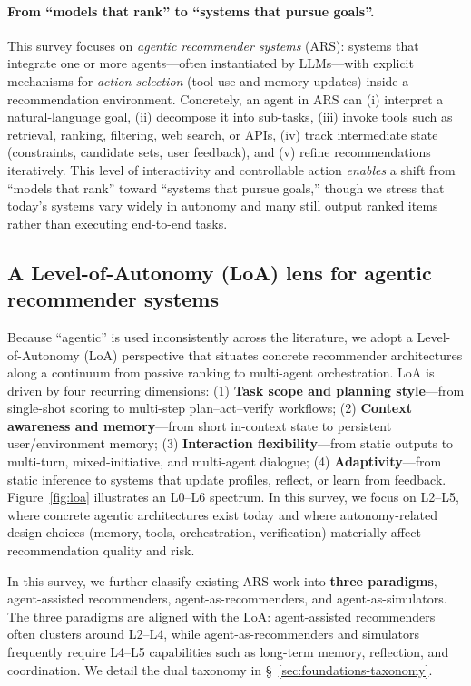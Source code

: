 \paragraph{From ``models that rank'' to ``systems that pursue goals''.}
This survey focuses on \emph{agentic recommender systems} (ARS): systems that integrate one or more agents---often instantiated by LLMs---with explicit mechanisms for \emph{action selection} (\eg tool use and memory updates) inside a recommendation environment.
Concretely, an agent in ARS can (i) interpret a natural-language goal, (ii) decompose it into sub-tasks, (iii) invoke tools such as retrieval, ranking, filtering, web search, or APIs, (iv) track intermediate state (\eg constraints, candidate sets, user feedback), and (v) refine recommendations iteratively.
This level of interactivity and controllable action \emph{enables} a shift from ``models that rank'' toward ``systems that pursue goals,'' though we stress that today’s systems vary widely in autonomy and many still output ranked items rather than executing end-to-end tasks. 


\subsection{A Level-of-Autonomy (LoA) lens for agentic recommender systems}
\label{subsec:loa}

Because ``agentic'' is used inconsistently across the literature, we adopt a Level-of-Autonomy (LoA) perspective that situates concrete recommender architectures along a continuum from passive ranking to multi-agent orchestration.
LoA is driven by four recurring dimensions: 
(1) \textbf{Task scope and planning style}---from single-shot scoring to multi-step plan--act--verify workflows;
(2) \textbf{Context awareness and memory}---from short in-context state to persistent user/environment memory;
(3) \textbf{Interaction flexibility}---from static outputs to multi-turn, mixed-initiative, and multi-agent dialogue;
(4) \textbf{Adaptivity}---from static inference to systems that update profiles, reflect, or learn from feedback. 
Figure~\ref{fig:loa} illustrates an L0--L6 spectrum. In this survey, we focus on L2--L5, where concrete agentic architectures exist today and where autonomy-related design choices (memory, tools, orchestration, verification) materially affect recommendation quality and risk. 

In this survey, we further classify existing ARS work into \textbf{three paradigms}, \ie agent-assisted recommenders, agent-as-recommenders, and agent-as-simulators. The three paradigms are aligned with the LoA: 
agent-assisted recommenders often clusters around L2--L4, while agent-as-recommenders and simulators frequently require L4--L5 capabilities such as long-term memory, reflection, and coordination. We detail the dual taxonomy in \S~\ref{sec:foundations-taxonomy}. 

